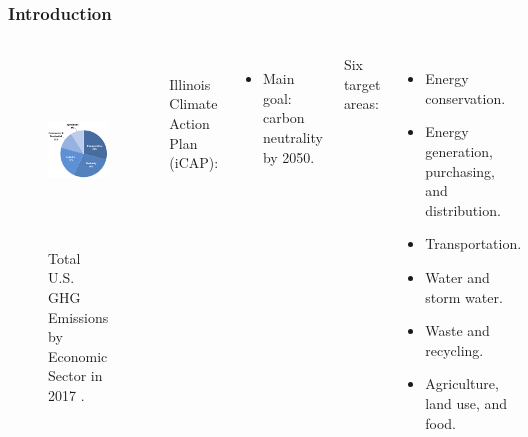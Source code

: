 \begin{frame}
\frametitle{Introduction}
\begin{columns}
    \column[t]{5cm}
	\begin{figure}[htbp!]
		\begin{center}
			\includegraphics[height=5.0cm]{images/total-ghg-2017.png}
		\end{center}
		\caption{Total U.S. GHG Emissions by Economic Sector in 2017 \cite{us_epa_sources_2020}.}
	\end{figure}

	\column[t]{5cm}
	\\
	Illinois Climate Action Plan (iCAP):
	\begin{itemize}
		\item Main goal: carbon neutrality by 2050.
	\end{itemize}
	\vspace{0.75cm}
	Six target areas:
	\begin{itemize}
		\item Energy conservation.
		\item Energy generation, purchasing, and distribution.
		\item Transportation.
		\item Water and storm water.
		\item Waste and recycling.
		\item Agriculture, land use, and food.
	\end{itemize}
\end{columns}
\end{frame}



